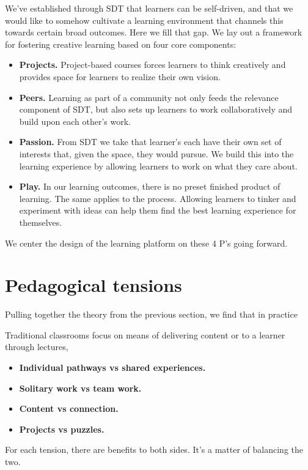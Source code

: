 \documentclass[12pt,twoside,vi]{mitthesis}
\begin{document}
We've established through SDT that learners can be self-driven, and that we would like to somehow cultivate a learning environment that channels this towards certain broad outcomes. Here we fill that gap. We lay out a framework for fostering creative learning based on four core components:
\begin{itemize}
\item \textbf{Projects.} Project-based courses forces learners to think creatively and provides space for learners to realize their own vision.
\item \textbf{Peers.} Learning as part of a community not only feeds the relevance component of SDT, but also sets up learners to work collaboratively and build upon each other's work.
\item \textbf{Passion.} From SDT we take that learner's each have their own set of interests that, given the space, they would pursue. We build this into the learning experience by allowing learners to work on what they care about.
\item \textbf{Play.} In our learning outcomes, there is no preset finished product of learning. The same applies to the process. Allowing learners to tinker and experiment with ideas can help them find the best learning experience for themselves.~\cite{cultivating}\cite{resnick2014give}\cite{creativelearningfuturework}
\end{itemize}
We center the design of the learning platform on these 4 P's going forward. 

\section{Pedagogical tensions}

Pulling together the theory from the previous section, we find that in practice 

Traditional classrooms focus on means of delivering content or  to a learner through lectures, 

\begin{itemize}
	\item \textbf{Individual pathways vs shared experiences.} 
	\item \textbf{Solitary work vs team work.} 
	\item \textbf{Content vs connection.} 
	\item \textbf{Projects vs puzzles.} 
\end{itemize} 

For each tension, there are benefits to both sides. It's a matter of balancing the two.
\end{document}
